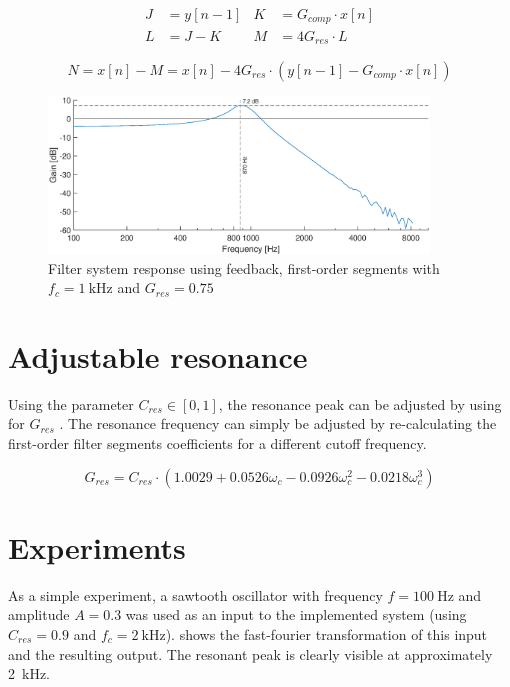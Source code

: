 \documentclass[a4paper, 12pt]{article}
\begin{document}
\begin{align}
	\label{eq:nodes5}
	J &= y[n-1] & K &= G_{comp} \cdot x[n] \\
	\label{eq:nodes6}
	L &= J - K & M &= 4 G_{res} \cdot L
\end{align}
	
\begin{equation}
	\label{eq:nodes7}
	N = x[n] - M = x[n] - 4 G_{res} \cdot (y[n-1] - G_{comp} \cdot x[n])
\end{equation}

\begin{figure}
	\centering
	\includegraphics[width=0.9\textwidth]{feedback-response.eps}
	\caption{Filter system response using feedback, first-order segments with $f_c = \SI{1}{\kilo\hertz}$ and $G_{res}=0.75$}
	\label{fig:feedback-response}
\end{figure}

\section{Adjustable resonance}
Using the parameter $C_{res} \in [0, 1]$, the resonance peak can be adjusted by using  for $G_{res}$ \cite{Vaelimaeki2006}. The resonance frequency can simply be adjusted by re-calculating the first-order filter segments coefficients for a different cutoff frequency.

\begin{equation}
	\label{eq:gres-polynom}
	G_{res} = C_{res} \cdot (1.0029 + 0.0526 \omega_c - 0.0926 \omega_c^2 - 0.0218 \omega_c^3)
\end{equation}

\section{Experiments}
As a simple experiment, a sawtooth oscillator with frequency $f=\SI{100}{\hertz}$ and amplitude $A=0.3$ was used as an input to the implemented system (using $C_{res}=0.9$ and $f_c = \SI{2}{\kilo\hertz}$).  shows the fast-fourier transformation of this input and the resulting output. The resonant peak is clearly visible at approximately \SI{2}{\kilo\hertz}.
\end{document}
